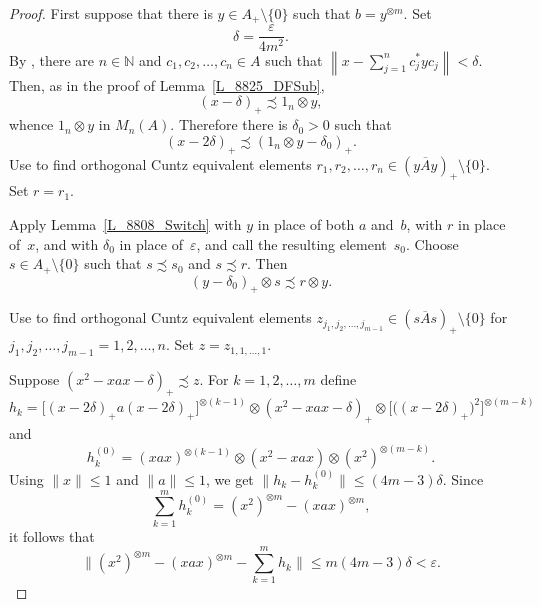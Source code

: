 \documentclass[11pt]{amsart}
\theoremstyle{plain}
\theoremstyle{definition}
\theoremstyle{remark}
\numberwithin{equation}{section}
\newcommand{\N}{\mathbb{N}}
\newcommand{\dt}{\delta}
\newcommand{\ep}{\varepsilon}
\begin{document}
\begin{proof}
First suppose that there is $y \in A_{+} \setminus \{ 0 \}$
such that $b = y^{\otimes m}$.
Set
\[
\dt = \frac{\ep}{4 m^2}.
\]
By \cite[Lemma 1.13]{Ph14},
there are $n \in \N$ and $c_1, c_2, \ldots, c_n \in A$
such that $\left\| x - \sum_{j = 1}^n c_j^* y c_j \right\| < \dt$.
Then, as in the proof of Lemma~\ref{L_8825_DFSub},
%
\begin{equation}\label{Eq_8817_NN}
(x - \dt)_{+}
  \precsim 1_n \otimes y,
\end{equation}
%
whence $ 1_n \otimes y$ in $M_n (A)$.
Therefore there is $\dt_0 > 0$ such that
%
\begin{equation}\label{Eq_8808_Label}
(x - 2 \dt)_{+} \precsim (1_n \otimes y - \dt_0)_{+}.
\end{equation}
%
Use \cite[Lemma~2.4]{Ph14} to find orthogonal
Cuntz equivalent elements
$r_1, r_2, \ldots, r_n \in ({\overline{y A y}} )_{+} \setminus \{ 0 \}$.
Set $r = r_1$.

Apply Lemma~\ref{L_8808_Switch} with $y$ in place of both $a$ and~$b$,
with $r$ in place of~$x$,
and with $\dt_0$ in place of~$\ep$,
and call the resulting element~$s_0$.
Choose $s \in A_{+} \setminus \{ 0 \}$
such that $s \precsim s_0$ and $s \precsim r$.
Then
%
\begin{equation}\label{Eq_8817_Sw}
(y - \dt_0)_{+} \otimes s \precsim r \otimes y.
\end{equation}
%

Use \cite[Lemma~2.4]{Ph14} to find orthogonal
Cuntz equivalent elements
$z_{j_1, j_2, \ldots, j_{m - 1}}
 \in ({\overline{s A s}} )_{+} \setminus \{ 0 \}$
for $j_1, j_2, \ldots, j_{m - 1} = 1, 2, \ldots, n$.
Set $z = z_{1, 1, \ldots, 1}$.

Suppose $( x^2 - x a x - \dt )_{+} \precsim z$.
For $k = 1, 2, \ldots, m$ define
\[
h_k
 = \big[ (x - 2 \dt)_{+} a (x - 2 \dt)_{+} \bigr]^{\otimes (k - 1)}
  \otimes ( x^2 - x a x - \dt )_{+}
  \otimes
     \big[ \bigl( (x - 2 \dt)_{+} \bigr)^2 \bigr]^{\otimes (m - k )}
\]
and
\[
h_k^{(0)}
 = (x a x)^{\otimes (k - 1)}
  \otimes ( x^2 - x a x )
  \otimes ( x^2 )^{\otimes (m - k )}.
\]
Using
$\| x \| \leq 1$ and $\| a \| \leq 1$,
we get
$\bigl\| h_k -  h_k^{(0)} \bigr\| \leq (4 m - 3) \dt$.
Since
\[
\sum_{k = 1}^m h_k^{(0)} = ( x^2 )^{\otimes m} - (x a x)^{\otimes m},
\]
it follows that
%
\begin{equation}\label{Eq_8808_LabelTwo}
\Biggl\| ( x^2 )^{\otimes m}
    - (x a x)^{\otimes m} - \sum_{k = 1}^m h_k \Biggr\|
 \leq m (4 m - 3) \dt
 < \ep.
\end{equation}
%


\end{proof}
\end{document}
